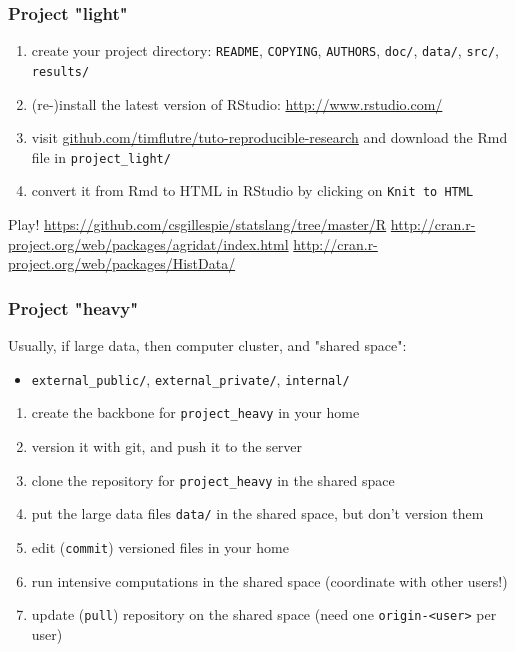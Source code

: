 \documentclass[c]{beamer} %
\begin{document}
\begin{frame}[fragile]
  \frametitle{Project "light"}
  \begin{enumerate}
  \item create your project directory: \verb+README+, \verb+COPYING+, \verb+AUTHORS+, \verb+doc/+, \verb+data/+, \verb+src/+, \verb+results/+
  \item (re-)install the latest version of RStudio: \url{http://www.rstudio.com/}
  \item visit \href{https://github.com/timflutre/tuto-reproducible-research}{github.com/timflutre/tuto-reproducible-research} and download the Rmd file in \verb+project_light/+
  \item convert it from Rmd to HTML in RStudio by clicking on \verb+Knit to HTML+
  \end{enumerate}
  \bigskip
  \pause
  Play!
  \small
  \url{https://github.com/csgillespie/statslang/tree/master/R}
  \url{http://cran.r-project.org/web/packages/agridat/index.html}
  \url{http://cran.r-project.org/web/packages/HistData/}
\end{frame}

\begin{frame}[fragile]
  \frametitle{Project "heavy"}
  Usually, if large data, then computer cluster, and "shared space":
  \begin{itemize}
  \item \verb+external_public/+, \verb+external_private/+, \verb+internal/+
  \end{itemize}
  
  \bigskip
  \pause
  
  \begin{enumerate}
  \item create the backbone for \verb+project_heavy+ in your home
  \item version it with git, and push it to the server
  \item clone the repository for \verb+project_heavy+ in the shared space
  \item put the large data files \verb+data/+ in the shared space, but don't version them
  \item edit (\verb+commit+) versioned files in your home
  \item run intensive computations in the shared space (coordinate with other users!)
  \item update (\verb+pull+) repository on the shared space (need one \verb+origin-<user>+ per user)
  \end{enumerate}
\end{frame}
\end{document}
